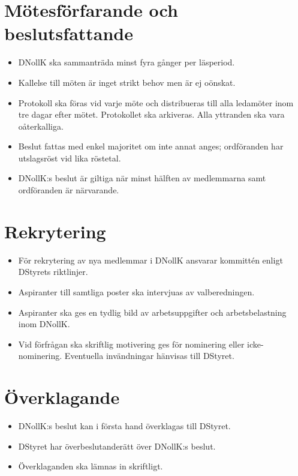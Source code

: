\documentclass[a4paper]{dtekinstruktion}
\begin{document}
\section{Mötesförfarande och beslutsfattande}
\begin{itemize}
  \item DNollK ska sammanträda minst fyra gånger per läsperiod.
  \item Kallelse till möten är inget strikt behov men är ej oönskat.
  \item Protokoll ska föras vid varje möte och distribueras till alla ledamöter inom tre dagar efter mötet. Protokollet ska arkiveras. Alla yttranden ska vara oåterkalliga.
  \item Beslut fattas med enkel majoritet om inte annat anges; ordföranden har utslagsröst vid lika röstetal.
  \item DNollK:s beslut är giltiga när minst hälften av medlemmarna samt ordföranden är närvarande.
\end{itemize}

\section{Rekrytering}
\begin{itemize}
  \item För rekrytering av nya medlemmar i DNollK ansvarar kommittén enligt DStyrets riktlinjer.
  \item Aspiranter till samtliga poster ska intervjuas av valberedningen.
  \item Aspiranter ska ges en tydlig bild av arbetsuppgifter och arbetsbelastning inom DNollK.
  \item Vid förfrågan ska skriftlig motivering ges för nominering eller icke-nominering. Eventuella invändningar hänvisas till DStyret.
\end{itemize}

\section{Överklagande}
\begin{itemize}
  \item DNollK:s beslut kan i första hand överklagas till DStyret.
  \item DStyret har överbeslutanderätt över DNollK:s beslut.
  \item Överklaganden ska lämnas in skriftligt.
\end{itemize}
\end{document}
